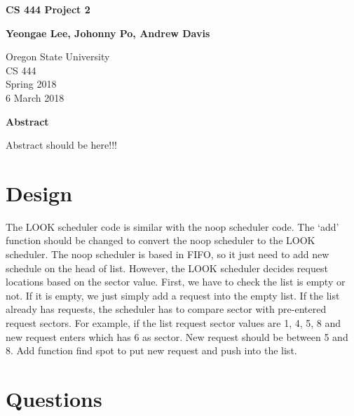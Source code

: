 \documentclass[10pt, letterpaper]{article}
\begin{document}
\begin{titlepage}

    \begin{center}
        \vspace*{5cm}
        
        \textbf{CS 444 Project 2}

        \vspace{1.5cm}

        \textbf{Yeongae Lee, Johonny Po, Andrew Davis}

        \vspace{0.8cm}

        Oregon State University\\
        CS 444\\
        Spring 2018\\
        6 March 2018\\

        \vspace{0.8cm}

        \textbf{Abstract}\\

        \vspace{0.5cm}

        Abstract should be here!!!


        \vfill
    \end{center}
\end{titlepage}

\newpage


\section{Design}
	The LOOK scheduler code is similar with the noop scheduler code. The ‘add’ function should be changed to convert the noop scheduler to the LOOK scheduler. The noop scheduler is based in FIFO, so it just need to add new schedule on the head of list. However, the LOOK scheduler decides request locations based on the sector value. First, we have to check the list is empty or not. If it is empty, we just simply add a request into the empty list. If the list already has requests, the scheduler has to compare sector with pre-entered request sectors. For example, if the list request sector values are 1, 4, 5, 8 and new request enters which has 6 as sector. New request should be between 5 and 8. Add function find spot to put new request and push into the list. 

    
    
\section{Questions}
\end{document}
